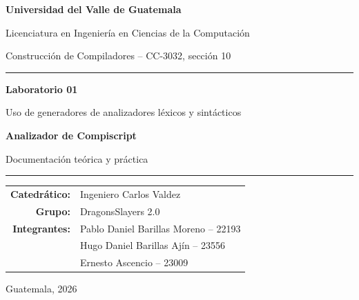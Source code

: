 \documentclass[12pt,letterpaper,oneside]{report}
\newcommand{\proyecto}{Analizador de Compiscript}
\begin{document}
\hypersetup{pageanchor=false}

\begin{titlepage}
  \centering
  \vspace*{1.0cm}
  {\Large\bfseries Universidad del Valle de Guatemala\par}
  \vspace{0.35cm}
  {\large Licenciatura en Ingeniería en Ciencias de la Computación\par}
  \vspace{0.2cm}
  {\large Construcción de Compiladores -- CC-3032, sección 10\par}

  \vfill

  \color{uvgblue}\rule{0.88\textwidth}{1.2pt}\color{black}
  \vspace{0.8cm}

  {\Huge\bfseries Laboratorio 01\par}
  \vspace{0.35cm}
  {\LARGE Uso de generadores de analizadores léxicos y sintácticos\par}
  \vspace{0.7cm}
  {\Huge\color{compipurple}\bfseries \proyecto\par}
  \vspace{0.3cm}
  {\Large Documentación teórica y práctica\par}

  \vspace{0.8cm}
  \color{uvgblue}\rule{0.88\textwidth}{1.2pt}\color{black}

  \vfill

  \begin{tabular}{>{\bfseries}rl}
    Catedrático: & Ingeniero Carlos Valdez \\
    Grupo: & DragonsSlayers 2.0 \\
    Integrantes: & Pablo Daniel Barillas Moreno -- 22193 \\
                 & Hugo Daniel Barillas Ajín -- 23556 \\
                 & Ernesto Ascencio -- 23009 \\
  \end{tabular}

  \vfill
  {\large Guatemala, 2026\par}
\end{titlepage}
\end{document}
